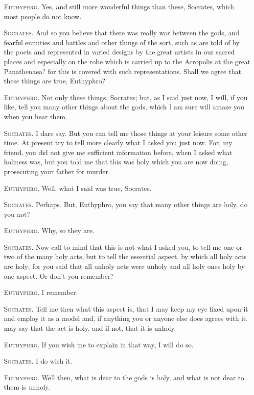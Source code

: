 \textsc{Euthyphro}. Yes, and still more wonderful things than these,
Socrates, which most people do not know.

\textsc{Socrates}. And so you believe that there was really war
between the gods, and fearful enmities and battles and other things of
the sort, such as are told of by the poets and represented in varied
designs by the great artists in our sacred places and especially on
the robe which is carried up to the Acropolis at the great
Panathenaea? for this is covered with such representations. Shall we
agree that these things are true, Euthyphro?

\textsc{Euthyphro}. Not only these things, Socrates; but, as I said
just now, I will, if you like, tell you many other things about the
gods, which I am sure will amaze you when you hear them.

\textsc{Socrates}. I dare say. But you can tell me those things at
your leisure some other time. At present try to tell more clearly what
I asked you just now. For, my friend, you did not give me sufficient
information before, when I asked what holiness was, but you told me
that this was holy  which you are now doing, prosecuting your
father for murder.

\textsc{Euthyphro}. Well, what I said was true, Socrates.

\textsc{Socrates}. Perhaps. But, Euthyphro, you say that many other
things are holy, do you not?

\textsc{Euthyphro}. Why, so they are.

\textsc{Socrates}. Now call to mind that this is not what I asked you,
to tell me one or two of the many holy acts, but to tell the essential
aspect, by which all holy acts are holy; for you said that all unholy
acts were unholy and all holy ones holy by one aspect. Or don't you
remember?

\textsc{Euthyphro}. I remember.

\textsc{Socrates}. Tell me then what this aspect is, that I may keep
my eye fixed upon it and employ it as a model and, if anything you or
anyone else does agrees with it, may say that the act is holy, and if
not, that it is unholy.

\textsc{Euthyphro}. If you wish me to explain in that way, I will do
so.

\textsc{Socrates}. I do wish it.

\textsc{Euthyphro}. Well then, what is dear to the gods is holy, and
what is not dear to them is unholy.

